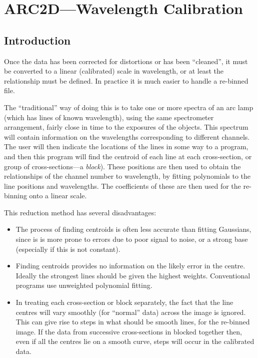 \section{ARC2D---Wavelength Calibration}
\label{sc.arc2d}
\subsection{Introduction}

Once the data has been corrected for distortions or has been
``cleaned'', it must be converted to a linear (calibrated) scale in
wavelength, or at least the relationship must be defined.
In practice it is much easier to handle a re-binned file. 

The ``traditional'' way of doing this is to take one or more spectra
of an arc lamp (which has lines of known wavelength), using the same
spectrometer arrangement, fairly close in time to the exposures of the
objects. This spectrum will contain information on the wavelengths
corresponding to different channels. The user will then indicate the
locations of the lines in some way to a program, and then this program
will find the centroid of each line at each cross-section, or group of
cross-sections---a {\em block}). These positions are then used to obtain
the relationships of the channel number to wavelength, by fitting
polynomials to the line positions and wavelengths. The coefficients of
these are then used for the re-binning onto a linear scale.

This reduction method has several disadvantages:
\begin{itemize}
\item The process of finding centroids is often less accurate than
fitting Gaussians, since is is more prone to errors due to poor signal
to noise, or a strong base (especially if this is not constant).
\item Finding centroids provides no information on the likely error
in the centre. Ideally the strongest lines should be given the highest
weights. Conventional programs use unweighted polynomial fitting.
\item In treating each cross-section or block separately, the fact that
the line centres will vary smoothly (for ``normal'' data) across the
image is ignored. This can give rise to steps in what should be smooth
lines, for the re-binned image. If the data from successive
cross-sections in blocked together then, even if all the centres lie on
a smooth curve, steps will occur in the calibrated data.
\end{itemize}

